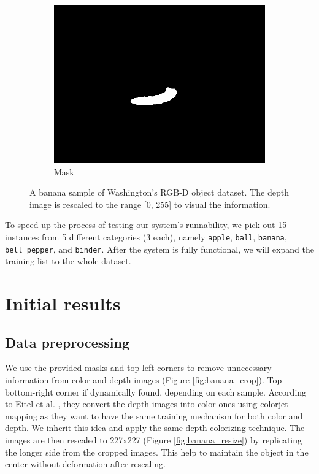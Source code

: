 \documentclass[paper=letter, fontsize=12pt]{article}
\begin{document}
\begin{figure}[htbp]
\begin{subfigure}[b]{0.32\linewidth}
		\includegraphics[width=\textwidth]{banana_1_1_1_mask}
		\caption{Mask}
	\end{subfigure}

	\caption{A banana sample of Washington's RGB-D object dataset. The depth image is rescaled to the range [0, 255] to visual the information.}
	\label{fig:banana}
\end{figure}

To speed up the process of testing our system's runnability, we pick out 15 instances from 5 different categories (3 each), namely \texttt{apple}, \texttt{ball}, \texttt{banana}, \texttt{bell\_pepper}, and \texttt{binder}. After the system is fully functional, we will expand the training list to the whole dataset.


\section{Initial results}
\subsection{Data preprocessing}
We use the provided masks and top-left corners to remove unnecessary information from color and depth images (Figure \ref{fig:banana_crop}). Top bottom-right corner if dynamically found, depending on each sample. According to Eitel et al. \cite{Eitel2015}, they convert the depth images into color ones using colorjet mapping as they want to have the same training mechanism for both color and depth. We inherit this idea and apply the same depth colorizing technique. The images are then rescaled to 227x227 (Figure \ref{fig:banana_resize}) by replicating the longer side from the cropped images. This help to maintain the object in the center without deformation after rescaling.
\end{document}
